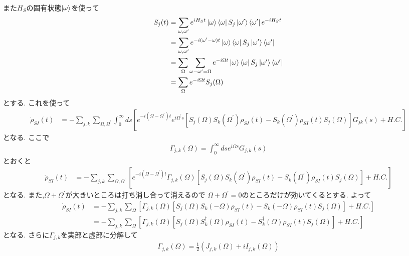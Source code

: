 また$H_S$の固有状態$\ket{\omega}$を使って
\begin{align}
  S_j(t) &= \sum_{\omega,\omega^{\prime}} 
  e^{iH_S t} \ket{\omega} \bra{\omega} S_j \ket{\omega^{\prime}} \bra{\omega^{\prime}} e^{-iH_S t} \\
  &= \sum_{\omega,\omega^{\prime}} 
  e^{-i(\omega^{\prime}-\omega) t} 
  \ket{\omega} \bra{\omega} S_j \ket{\omega^{\prime}} \bra{\omega^{\prime}} \\
  &= \sum_{\Omega} \sum_{\omega-\omega^{\prime}=\Omega} 
  e^{-i\Omega t} 
  \ket{\omega} \bra{\omega} S_j \ket{\omega^{\prime}} \bra{\omega^{\prime}} \\
  &= \sum_{\Omega}
  e^{-i\Omega t} S_j(\Omega)
\end{align}
とする.
これを使って
\begin{align}
  \dot{\rho}_{SI} (t)
  &= - \sum_{j,k} \sum_{\Omega,\Omega^{\prime}} \int^{\infty}_0 ds
  \left[
    e^{-i(\Omega - \Omega^{\prime}) t} e^{i\Omega^{\prime} s}
    \left[ 
      S_j(\Omega) S_k(\Omega^{\prime}) \rho_{SI}(t) - S_k(\Omega^{\prime}) \rho_{SI}(t) S_j(\Omega) 
    \right]G_{jk}(s) + H.C.
  \right]
\end{align}
となる.
ここで
\begin{align}
  \Gamma_{j,k}(\Omega) = \int^{\infty}_0 ds e^{i\Omega s} G_{j,k}(s)
\end{align}
とおくと
\begin{align}
  \dot{\rho}_{SI} (t)
  &= - \sum_{j,k} \sum_{\Omega,\Omega^{\prime}} 
  \left[
    e^{-i(\Omega - \Omega^{\prime}) t} \Gamma_{j,k}(\Omega)
    \left[ 
      S_j(\Omega) S_k(\Omega^{\prime}) \rho_{SI}(t) - S_k(\Omega^{\prime}) \rho_{SI}(t) S_j(\Omega) 
    \right] + H.C.
  \right]
\end{align}
となる.
また,$\Omega + \Omega^{\prime}$が大きいところは打ち消し合って消えるので
$\Omega + \Omega^{\prime}=0$のところだけが効いてくるとする.
よって
\begin{align}
  \dot{\rho}_{SI} (t)
  &= - \sum_{j,k} \sum_{\Omega} 
  \left[
    \Gamma_{j,k}(\Omega)
    \left[ 
      S_j(\Omega) S_k(-\Omega) \rho_{SI}(t) - S_k(-\Omega) \rho_{SI}(t) S_j(\Omega) 
    \right] + H.C.
  \right] \\
  &= - \sum_{j,k} \sum_{\Omega} 
  \left[
    \Gamma_{j,k}(\Omega)
    \left[ 
      S_j(\Omega) S^{\dagger}_k(\Omega) \rho_{SI}(t) - S^{\dagger}_k(\Omega) \rho_{SI}(t) S_j(\Omega) 
    \right] + H.C.
  \right]
\end{align}
となる.
さらに$\Gamma_{j,k}$を実部と虚部に分解して
\begin{align}
  \Gamma_{j,k} (\Omega) = \frac{1}{2} ( J_{j,k}(\Omega) + i I_{j,k}(\Omega) )
\end{align}
